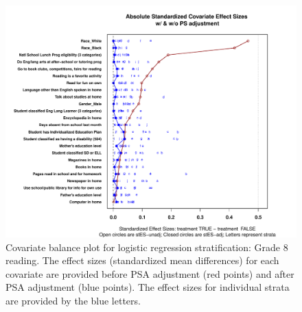 \begin{figure}[h!]
\begin{center}
\includegraphics[width=\textwidth]{../Figures2009/g8read-lr-balance.pdf}
\caption[Covariate balance plot for logistic regression stratification: Grade 8 reading]{Covariate balance plot for logistic regression stratification: Grade 8 reading. The effect sizes (standardized mean differences) for each covariate are provided before PSA adjustment (red points) and after PSA adjustment (blue points). The effect sizes for individual strata are provided by the blue letters.}
\end{center}
\end{figure}

